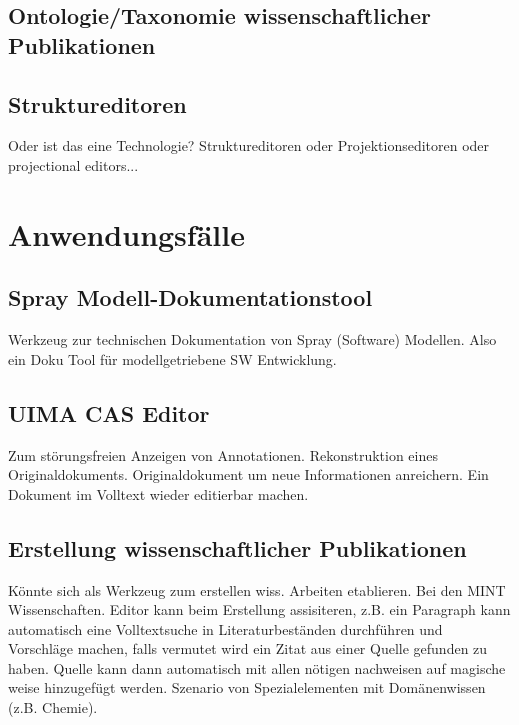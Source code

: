 \section{Ontologie/Taxonomie wissenschaftlicher Publikationen}

\section{Struktureditoren}

Oder ist das eine Technologie?
Struktureditoren oder Projektionseditoren oder projectional editors...



\chapter{Anwendungsfälle}

\section{Spray Modell-Dokumentationstool}

Werkzeug zur technischen Dokumentation von Spray (Software) Modellen.
Also ein Doku Tool für modellgetriebene SW Entwicklung.

\section{UIMA CAS Editor}

Zum störungsfreien Anzeigen von Annotationen.
Rekonstruktion eines Originaldokuments.
Originaldokument um neue Informationen anreichern.
Ein Dokument im Volltext wieder editierbar machen.

\section{Erstellung wissenschaftlicher Publikationen}

Könnte sich als Werkzeug zum erstellen wiss. Arbeiten etablieren.
Bei den MINT Wissenschaften.
Editor kann beim Erstellung assisiteren, z.B. ein Paragraph kann automatisch
eine Volltextsuche in Literaturbeständen durchführen und Vorschläge machen,
falls vermutet wird ein Zitat aus einer Quelle gefunden zu haben.
Quelle kann dann automatisch mit allen nötigen nachweisen auf magische weise
hinzugefügt werden.
Szenario von Spezialelementen mit Domänenwissen (z.B. Chemie).


